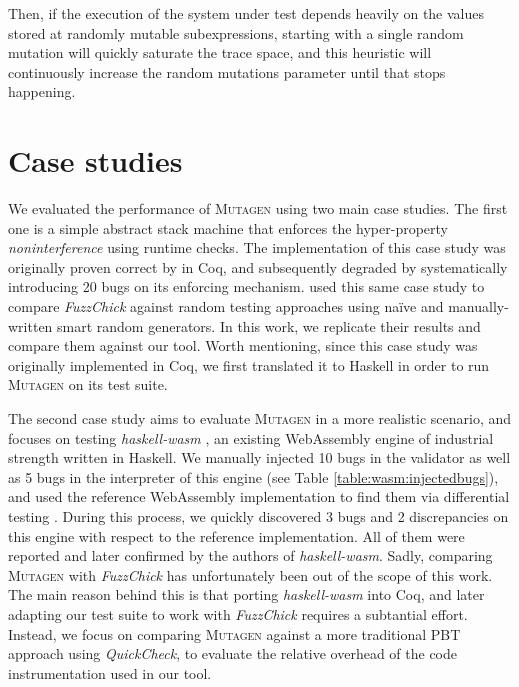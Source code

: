 \documentclass[sigconf, anonymous]{acmart}
\newcommand{\quickcheck}{\textit{QuickCheck}\xspace}
\newcommand{\fuzzchick}{\textit{FuzzChick}\xspace}
\newcommand{\mutagen}{\textsc{Mutagen}\xspace}
\begin{document}
Then, if the execution of the system under test depends heavily on the values
stored at randomly mutable subexpressions, starting with a single random
mutation will quickly saturate the trace space, and this heuristic will
continuously increase the random mutations parameter until that stops happening.





\section{Case studies}
\label{sec:casestudies}

We evaluated the performance of \mutagen using two main case studies.
%
The first one is a simple abstract stack machine that enforces the
hyper-property \emph{noninterference} \cite{goguen1982security} using runtime
checks.
%
The implementation of this case study was originally proven correct by
\citeauthor{10.1145/2578855.2535839} \citeyearpar{10.1145/2578855.2535839} in
Coq, and subsequently degraded by systematically introducing 20 bugs on its
enforcing mechanism.
%
\citeauthor{lampropoulos2019coverage} used this same case study to compare
\fuzzchick against random testing approaches using na\"ive and manually-written
smart random generators.
%
In this work, we replicate their results and compare them against our tool.
%
Worth mentioning, since this case study was originally implemented in Coq, we
first translated it to Haskell in order to run \mutagen on its test suite.


The second case study aims to evaluate \mutagen in a more realistic scenario,
and focuses on testing \textit{haskell-wasm} \cite{haskellwasm}, an existing
WebAssembly engine of industrial strength written in Haskell.
%
We manually injected 10 bugs in the validator as well as 5 bugs in the
interpreter of this engine (see Table \ref{table:wasm:injectedbugs}), and used
the reference WebAssembly implementation to find them via differential testing
\cite{mckeeman1998differential}.
%
During this process, we quickly discovered 3 bugs and 2 discrepancies on this
engine with respect to the reference implementation.
%
All of them were reported and later confirmed by the authors of
\textit{haskell-wasm}.
%
Sadly, comparing \mutagen with \fuzzchick has unfortunately been out of the
scope of this work.
%
The main reason behind this is that porting \textit{haskell-wasm} into Coq, and
later adapting our test suite to work with \fuzzchick requires a subtantial
effort.
%
Instead, we focus on comparing \mutagen against a more traditional PBT approach
using \quickcheck, to evaluate the relative overhead of the code instrumentation
used in our tool.
\end{document}

